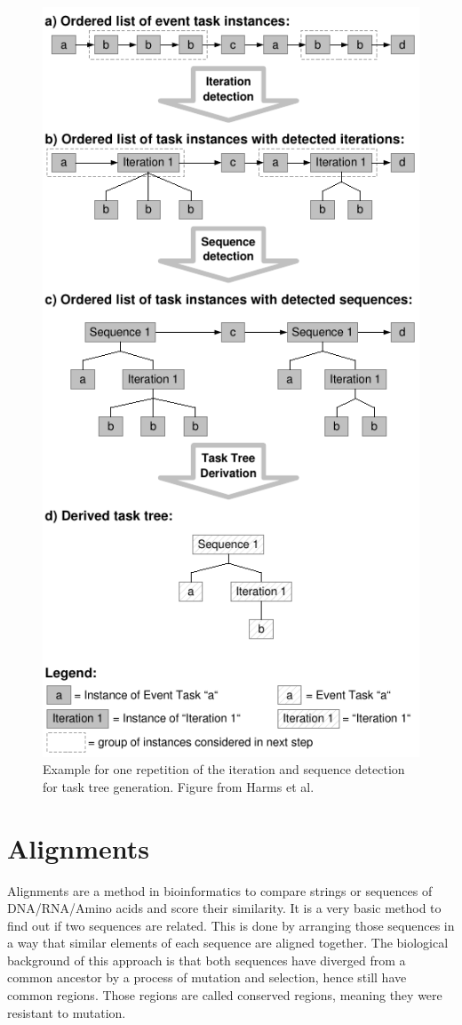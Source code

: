 \begin{figure}
	\centering
	\includegraphics[scale=0.85]{chapters/foundations/TaskDetection.pdf}
	\caption{Example for one repetition of the iteration and sequence detection for task tree generation. Figure from Harms et al.}
	\label{fig:exampletasktreeharms}
\end{figure}
\clearpage
\section{Alignments}
\label{sec:alignments}
Alignments are a method in bioinformatics to compare strings or sequences of DNA/RNA/Amino acids and score their similarity.
It is a very basic method to find out if two sequences are related.
This is done by arranging those sequences in a way that similar elements of each sequence are aligned together. The biological background of this approach is that
both sequences have diverged from a common ancestor by a process of mutation and selection\cite{durbin1998}, hence still have common regions. Those regions are called conserved regions, meaning they were resistant to mutation.

